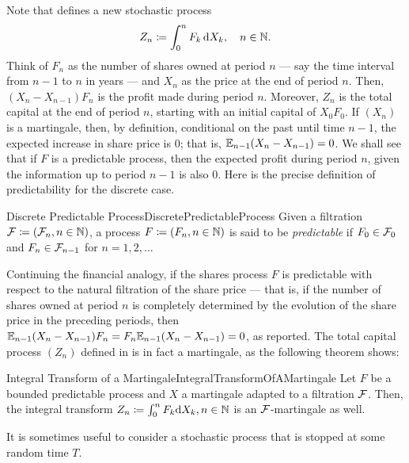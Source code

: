 Note that  defines a new stochastic process
\begin{equation}\label{eq:DiscreteProcessZ}
	Z_n \coloneqq \int_0^n F_k \, \mathrm{d} X_k, \quad n \in \mathbb{N}.
\end{equation}
Think of \(F_n\) as the number of shares owned at period \(n\) --- say the time interval from \(n-1\) to \(n\) in years --- and \(X_n\) as the price at the end of period \(n\). Then, \((X_n - X_{n-1}) F_n\) is the profit made during period \(n\). Moreover, \(Z_n\) is the total capital at the end of period \(n\), starting with an initial capital of \(X_0 F_0\). If \((X_n)\) is a martingale, then, by definition, conditional on the past until time \(n-1\), the expected increase in share price is 0; that is, \(\mathbb{E}_{n-1}(X_n - X_{n-1}) = 0\). We shall see that if \(F\) is a predictable process, then the expected profit during period \(n\), given the information up to period \(n-1\) is also 0. Here is the precise definition of predictability for the discrete case.


\begin{defn}{Discrete Predictable Process}{DiscretePredictableProcess}
	Given a filtration \(\mathcal{F} \coloneqq (\mathcal{F}_n, n \in \mathbb{N})\), a process \(F \coloneqq (F_n, n \in \mathbb{N})\) is said to be \emph{predictable} if \(F_0 \in \mathcal{F}_0\) and \(F_n \in \mathcal{F}_{n-1}\) for \(n = 1, 2, \ldots\)
\end{defn}

Continuing the financial analogy, if the shares process \(F\) is predictable with respect to the natural filtration of the share price — that is, if the number of shares owned at period \(n\) is completely determined by the evolution of the share price in the preceding periods, then \(\mathbb{E}_{n-1}(X_n - X_{n-1})F_n = F_n \mathbb{E}_{n-1}(X_n - X_{n-1}) = 0\), as reported. The total capital process \((Z_n)\) defined in  is in fact a martingale, as the following theorem shows:

\begin{thm}{Integral Transform of a Martingale}{IntegralTransformOfAMartingale}
	Let \(F\) be a bounded predictable process and \(X\) a martingale adapted to a filtration \(\mathcal{F}\). Then, the integral transform \(Z_n \coloneqq \int_0^n F_k \mathrm{d} X_k, n \in \mathbb{N}\) is an \(\mathcal{F}\)-martingale as well.
\end{thm}

It is sometimes useful to consider a stochastic process that is stopped at some random time \(T\).

